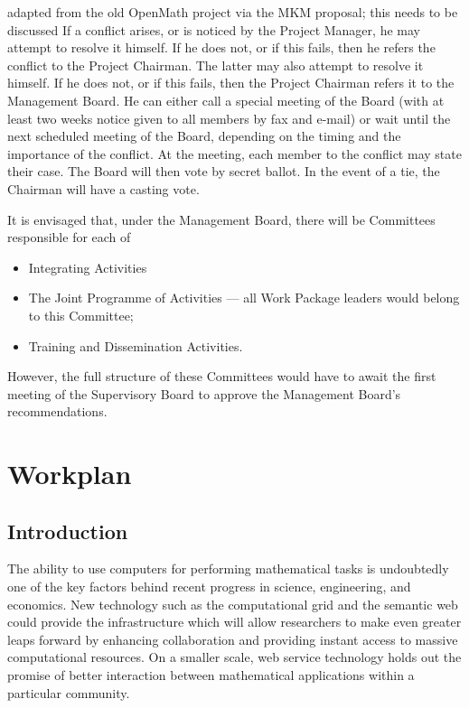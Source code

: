 \documentclass{euproposal}
\begin{document}
\begin{newpart}{adapted from the old OpenMath project via the MKM proposal; this
    needs to be discussed}
If a conflict arises, or is noticed by the Project Manager, he may
attempt to resolve it himself. If he does not, or if this fails, then
he refers the conflict to the Project Chairman. The latter may also
attempt to resolve it himself. If he does not, or if this fails, then
the Project Chairman refers it to the Management Board. He can either
call a special meeting of the Board (with at least two weeks notice
given to all members by fax and e-mail) or wait until the next
scheduled meeting of the Board, depending on the timing and the
importance of the conflict.  At the meeting, each member to the
conflict may state their case. The Board will then vote by secret
ballot. In the event of a tie, the Chairman will have a casting vote.

It is envisaged that, under the Management Board, there will be
Committees responsible for each of
\begin{itemize}
\item Integrating Activities
\item The Joint Programme of Activities --- all Work Package leaders
  would belong to this Committee;
\item Training and Dissemination Activities.
\end{itemize}
However, the full structure of these Committees would have to await
the first meeting of the Supervisory Board to approve the Management
Board's recommendations.
\end{newpart}

\chapter{Workplan}\label{cha:workplan}



\section{Introduction}

The ability to use computers for performing mathematical tasks is
undoubtedly one of the key factors behind recent progress in science,
engineering, and economics.  New technology such as the computational
grid and the semantic web could provide the infrastructure which will
allow researchers to make even greater leaps forward by enhancing
collaboration and providing instant access to massive computational
resources.  On a smaller scale, web service technology holds out the
promise of better interaction between mathematical applications within
a particular community.
\end{document}
